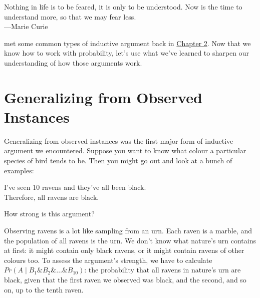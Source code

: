 \documentclass[justified]{tufte-book}
\newcommand{\given}{\mid}
\renewcommand{\wedge}{\mathbin{\&}}
\newcommand{\p}{Pr}
\newenvironment{epigraph}%
{
\begin{flushright}    
\begin{minipage}{20em}
\begin{flushright}
\itshape
}%
{
\end{flushright}
\end{minipage}
\end{flushright}
}
\theoremstyle{definition}
\theoremstyle{definition}
\theoremstyle{definition}
\theoremstyle{definition}
\theoremstyle{remark}
\begin{document}
\begin{epigraph}
Nothing in life is to be feared, it is only to be understood. Now is the
time to understand more, so that we may fear less.\\
---Marie Curie
\end{epigraph}

 met some common types of inductive argument back in \protect\hyperlink{indargs}{Chapter 2}. Now that we know how to work with probability, let's use what we've learned to sharpen our understanding of how those arguments work.

\hypertarget{generalizing-from-observed-instances}{%
\section{Generalizing from Observed Instances}\label{generalizing-from-observed-instances}}

Generalizing from observed instances was the first major form of inductive argument we encountered. Suppose you want to know what colour a particular species of bird tends to be. Then you might go out and look at a bunch of examples:

\begin{argument}
I've seen \(10\) ravens and they've all been black.\\
Therefore, all ravens are black.
\end{argument}

How strong is this argument?

Observing ravens is a lot like sampling from an urn. Each raven is a marble, and the population of all ravens is the urn. We don't know what nature's urn contains at first: it might contain only black ravens, or it might contain ravens of other colours too. To assess the argument's strength, we have to calculate \(\p(A \given B_1 \wedge B_2 \wedge \ldots \wedge B_{10})\): the probability that all ravens in nature's urn are black, given that the first raven we observed was black, and the second, and so on, up to the tenth raven.
\end{document}
